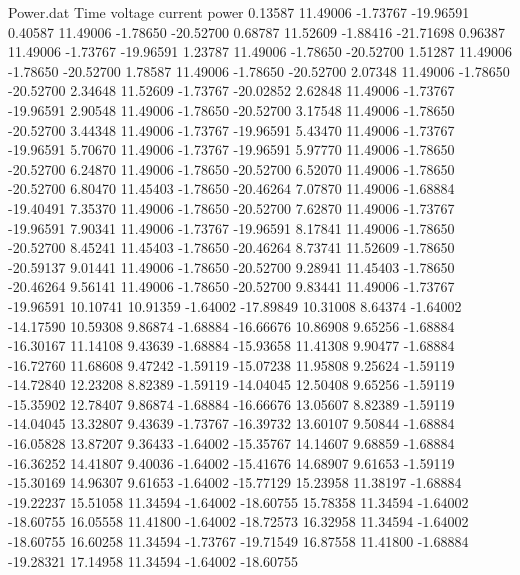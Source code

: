 \begin{filecontents}{Power.dat}
Time voltage current power
   0.13587   11.49006   -1.73767  -19.96591
   0.40587   11.49006   -1.78650  -20.52700
   0.68787   11.52609   -1.88416  -21.71698
   0.96387   11.49006   -1.73767  -19.96591
   1.23787   11.49006   -1.78650  -20.52700
   1.51287   11.49006   -1.78650  -20.52700
   1.78587   11.49006   -1.78650  -20.52700
   2.07348   11.49006   -1.78650  -20.52700
   2.34648   11.52609   -1.73767  -20.02852
   2.62848   11.49006   -1.73767  -19.96591
   2.90548   11.49006   -1.78650  -20.52700
   3.17548   11.49006   -1.78650  -20.52700
   3.44348   11.49006   -1.73767  -19.96591
   5.43470   11.49006   -1.73767  -19.96591
   5.70670   11.49006   -1.73767  -19.96591
   5.97770   11.49006   -1.78650  -20.52700
   6.24870   11.49006   -1.78650  -20.52700
   6.52070   11.49006   -1.78650  -20.52700
   6.80470   11.45403   -1.78650  -20.46264
   7.07870   11.49006   -1.68884  -19.40491
   7.35370   11.49006   -1.78650  -20.52700
   7.62870   11.49006   -1.73767  -19.96591
   7.90341   11.49006   -1.73767  -19.96591
   8.17841   11.49006   -1.78650  -20.52700
   8.45241   11.45403   -1.78650  -20.46264
   8.73741   11.52609   -1.78650  -20.59137
   9.01441   11.49006   -1.78650  -20.52700
   9.28941   11.45403   -1.78650  -20.46264
   9.56141   11.49006   -1.78650  -20.52700
   9.83441   11.49006   -1.73767  -19.96591
  10.10741   10.91359   -1.64002  -17.89849
  10.31008    8.64374   -1.64002  -14.17590
  10.59308    9.86874   -1.68884  -16.66676
  10.86908    9.65256   -1.68884  -16.30167
  11.14108    9.43639   -1.68884  -15.93658
  11.41308    9.90477   -1.68884  -16.72760
  11.68608    9.47242   -1.59119  -15.07238
  11.95808    9.25624   -1.59119  -14.72840
  12.23208    8.82389   -1.59119  -14.04045
  12.50408    9.65256   -1.59119  -15.35902
  12.78407    9.86874   -1.68884  -16.66676
  13.05607    8.82389   -1.59119  -14.04045
  13.32807    9.43639   -1.73767  -16.39732
  13.60107    9.50844   -1.68884  -16.05828
  13.87207    9.36433   -1.64002  -15.35767
  14.14607    9.68859   -1.68884  -16.36252
  14.41807    9.40036   -1.64002  -15.41676
  14.68907    9.61653   -1.59119  -15.30169
  14.96307    9.61653   -1.64002  -15.77129
  15.23958   11.38197   -1.68884  -19.22237
  15.51058   11.34594   -1.64002  -18.60755
  15.78358   11.34594   -1.64002  -18.60755
  16.05558   11.41800   -1.64002  -18.72573
  16.32958   11.34594   -1.64002  -18.60755
  16.60258   11.34594   -1.73767  -19.71549
  16.87558   11.41800   -1.68884  -19.28321
  17.14958   11.34594   -1.64002  -18.60755

\end{filecontents}
